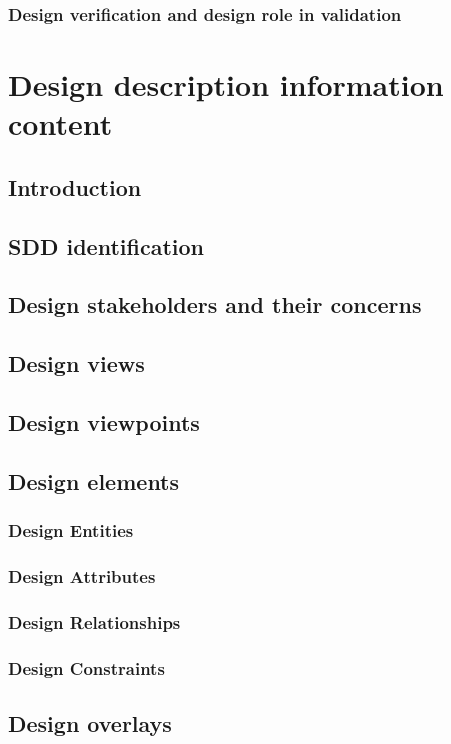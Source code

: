 \documentclass[onecolumn, draftclsnofoot,10pt, compsoc]{IEEEtran}
\begin{document}
\begin{singlespace}
		\subsubsection{Design verification and design role in validation}


\section{Design description information content}
	\subsection{Introduction}
	\subsection{SDD identification}
	\subsection{Design stakeholders and their concerns}
	\subsection{Design views}
	\subsection{Design viewpoints}
	\subsection{Design elements}
		\subsubsection{Design Entities}
		\subsubsection{Design Attributes}
		\subsubsection{Design Relationships}
		\subsubsection{Design Constraints}
	\subsection{Design overlays}

\end{singlespace}
\end{document}
